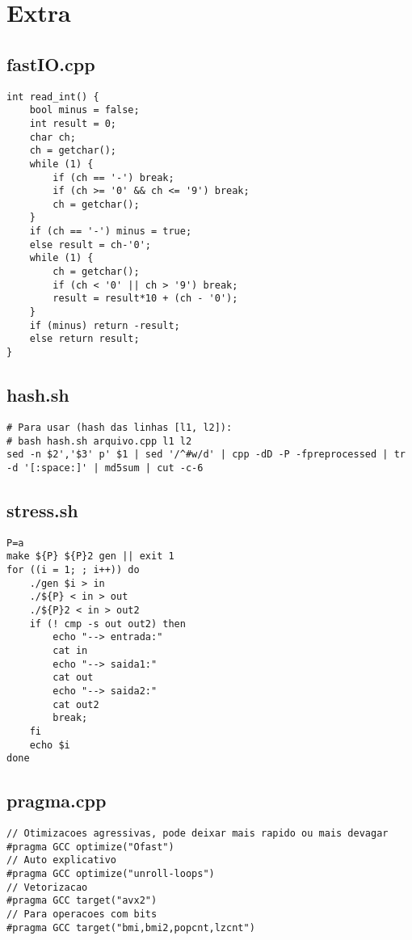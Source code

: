 \documentclass[11pt, a4paper, twoside]{article}
\begin{document}
%
%

\section{Extra}

\subsection{fastIO.cpp}
\begin{lstlisting}
int read_int() {
    bool minus = false;
    int result = 0;
    char ch;
    ch = getchar();
    while (1) {
        if (ch == '-') break;
        if (ch >= '0' && ch <= '9') break;
        ch = getchar();
    }
    if (ch == '-') minus = true;
    else result = ch-'0';
    while (1) {
        ch = getchar();
        if (ch < '0' || ch > '9') break;
        result = result*10 + (ch - '0');
    }
    if (minus) return -result;
    else return result;
}
\end{lstlisting}

\subsection{hash.sh}
\begin{lstlisting}
# Para usar (hash das linhas [l1, l2]):
# bash hash.sh arquivo.cpp l1 l2
sed -n $2','$3' p' $1 | sed '/^#w/d' | cpp -dD -P -fpreprocessed | tr -d '[:space:]' | md5sum | cut -c-6
\end{lstlisting}

\subsection{stress.sh}
\begin{lstlisting}
P=a
make ${P} ${P}2 gen || exit 1
for ((i = 1; ; i++)) do
	./gen $i > in
	./${P} < in > out
	./${P}2 < in > out2
	if (! cmp -s out out2) then
		echo "--> entrada:"
		cat in
		echo "--> saida1:"
		cat out
		echo "--> saida2:"
		cat out2
		break;
	fi
	echo $i
done
\end{lstlisting}

\subsection{pragma.cpp}
\begin{lstlisting}
// Otimizacoes agressivas, pode deixar mais rapido ou mais devagar
#pragma GCC optimize("Ofast")
// Auto explicativo
#pragma GCC optimize("unroll-loops")
// Vetorizacao
#pragma GCC target("avx2")
// Para operacoes com bits
#pragma GCC target("bmi,bmi2,popcnt,lzcnt")
\end{lstlisting}
\end{document}
